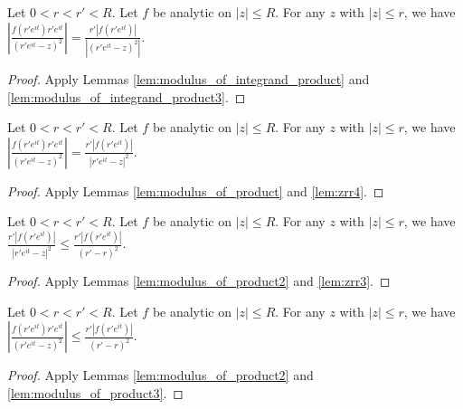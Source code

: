 

\begin{lemma}\label{lem:modulus_of_product} \leanok
Let $0 < r < r' < R$. Let $f$ be analytic on $|z| \le R$. For any $z$ with $|z| \le r$, we have
$\left|\frac{f(r'e^{it}) r'e^{it}}{(r'e^{it}-z)^2}\right| = \frac{r'|f(r'e^{it})|}{|(r'e^{it}-z)^2|}$.
\end{lemma}
\begin{proof}\leanok
{}
Apply Lemmas \ref{lem:modulus_of_integrand_product} and \ref{lem:modulus_of_integrand_product3}.
\end{proof}


\begin{lemma}\label{lem:modulus_of_product2} \leanok
Let $0 < r < r' < R$. Let $f$ be analytic on $|z| \le R$. For any $z$ with $|z| \le r$, we have
$\left|\frac{f(r'e^{it}) r'e^{it}}{(r'e^{it}-z)^2}\right| = \frac{r'|f(r'e^{it})|}{|r'e^{it}-z|^2}$.
\end{lemma}
\begin{proof}\leanok
{}
Apply Lemmas \ref{lem:modulus_of_product} and \ref{lem:zrr4}.
\end{proof}


\begin{lemma}\label{lem:modulus_of_product3} \leanok
Let $0 < r < r' < R$. Let $f$ be analytic on $|z| \le R$. For any $z$ with $|z| \le r$, we have
$\frac{r'|f(r'e^{it})|}{|r'e^{it}-z|^2} \le \frac{r'|f(r'e^{it})|}{(r'-r)^2}$.
\end{lemma}
\begin{proof}\leanok
{}
Apply Lemmas \ref{lem:modulus_of_product2} and \ref{lem:zrr3}.
\end{proof}



\begin{lemma}\label{lem:modulus_of_product4} \leanok
Let $0 < r < r' < R$. Let $f$ be analytic on $|z| \le R$. For any $z$ with $|z| \le r$, we have
$\left|\frac{f(r'e^{it}) r'e^{it}}{(r'e^{it}-z)^2}\right| \le \frac{r'|f(r'e^{it})|}{(r'-r)^2}$.
\end{lemma}
\begin{proof}\leanok
{}
Apply Lemmas \ref{lem:modulus_of_product2} and \ref{lem:modulus_of_product3}.
\end{proof}

